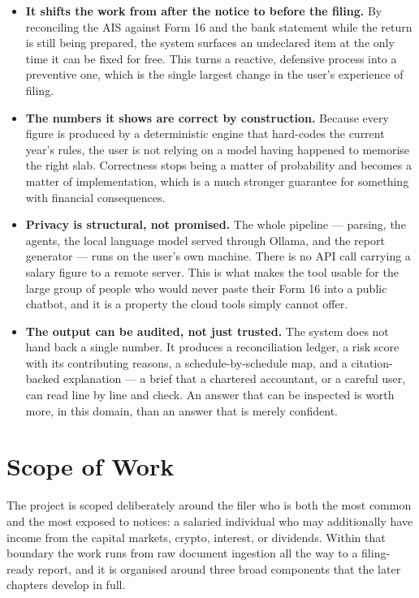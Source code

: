 \begin{itemize}
    \item \textbf{It shifts the work from after the notice to before the
          filing.} By reconciling the AIS against Form 16 and the bank statement
          while the return is still being prepared, the system surfaces an
          undeclared item at the only time it can be fixed for free. This turns
          a reactive, defensive process into a preventive one, which is the
          single largest change in the user's experience of filing.
    \item \textbf{The numbers it shows are correct by construction.} Because
          every figure is produced by a deterministic engine that hard-codes the
          current year's rules, the user is not relying on a model having
          happened to memorise the right slab. Correctness stops being a matter
          of probability and becomes a matter of implementation, which is a much
          stronger guarantee for something with financial consequences.
    \item \textbf{Privacy is structural, not promised.} The whole pipeline ---
          parsing, the agents, the local language model served through Ollama,
          and the report generator --- runs on the user's own machine. There is
          no API call carrying a salary figure to a remote server. This is what
          makes the tool usable for the large group of people who would never
          paste their Form 16 into a public chatbot, and it is a property the
          cloud tools simply cannot offer.
    \item \textbf{The output can be audited, not just trusted.} The system does
          not hand back a single number. It produces a reconciliation ledger, a
          risk score with its contributing reasons, a schedule-by-schedule map,
          and a citation-backed explanation --- a brief that a chartered
          accountant, or a careful user, can read line by line and check. An
          answer that can be inspected is worth more, in this domain, than an
          answer that is merely confident.
\end{itemize}

\section{Scope of Work}
\label{sec:scope}

The project is scoped deliberately around the filer who is both the most common
and the most exposed to notices: a salaried individual who may additionally have
income from the capital markets, crypto, interest, or dividends. Within that
boundary the work runs from raw document ingestion all the way to a
filing-ready report, and it is organised around three broad components that the
later chapters develop in full.

